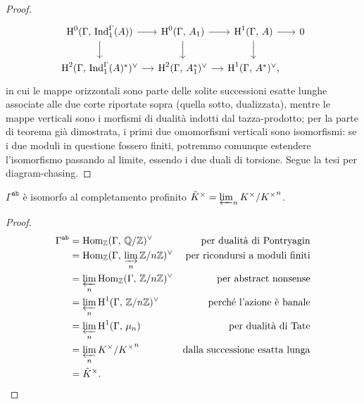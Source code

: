 \begin{proof}
\[\begin{tikzcd}[column sep = small]
	\HH^0(\Gamma, \, \Ind_1^\Gamma(A)) \rar\dar
	& \HH^0(\Gamma, \, A_1) \rar\dar
	& \HH^1(\Gamma, \, A) \rar\dar
	& 0 \\
	\HH^2(\Gamma, \, \Ind_1^\Gamma(A)^*)^\vee \rar
	& \HH^2(\Gamma, \, A_1^*)^\vee \rar
	& \HH^1(\Gamma, \, A^*)^\vee,
	&
	\end{tikzcd}  \]
	in cui le mappe orizzontali sono parte delle solite successioni esatte lunghe associate alle due corte riportate sopra (quella sotto, dualizzata), mentre le mappe verticali sono i morfismi di dualità indotti dal tazza-prodotto; per la parte di teorema già dimostrata, i primi due omomorfismi verticali sono isomorfismi: se i due moduli in questione fossero finiti, potremmo comunque estendere l'isomorfismo passando al limite, essendo i due duali di torsione. Segue la tesi per diagram-chasing.
\end{proof}


\begin{corollary}
	$ \Gamma^\mathtt{ab} $ è isomorfo al completamento profinito $ \hat{K}^\times = \varprojlim_n K^\times/ {K^\times}^n $.
\end{corollary}
\begin{proof}
	\begin{align*}
	\Gamma^\mathtt{ab}
	& = \operatorname{Hom}_{\mathbb{Z}}(\Gamma,\, \mathbb{Q}/\mathbb{Z})^\vee & \text{per dualità di Pontryagin} \\
	& = \operatorname{Hom}_{\mathbb{Z}}(\Gamma,\, \varinjlim_n \mathbb{Z}/n\mathbb{Z})^\vee & \text{per ricondursi a moduli finiti}\\ 
	& = \varprojlim_n \operatorname{Hom}_{\mathbb{Z}}(\Gamma,\, \mathbb{Z}/n\mathbb{Z})^\vee & \text{per abstract nonsense} \\
	& = \varprojlim_n \operatorname{H}^1(\Gamma,\, \mathbb{Z}/n\mathbb{Z})^\vee & \text{perché l'azione è banale} \\
	& = \varprojlim_n \operatorname{H}^1(\Gamma,\, \mu_n) & \text{per dualità di Tate} \\
	& = \varprojlim_n K^\times / {K^\times}^n & \text{dalla successione esatta lunga} \\
	& = \hat{K}^\times. 
	\end{align*}
\end{proof}
